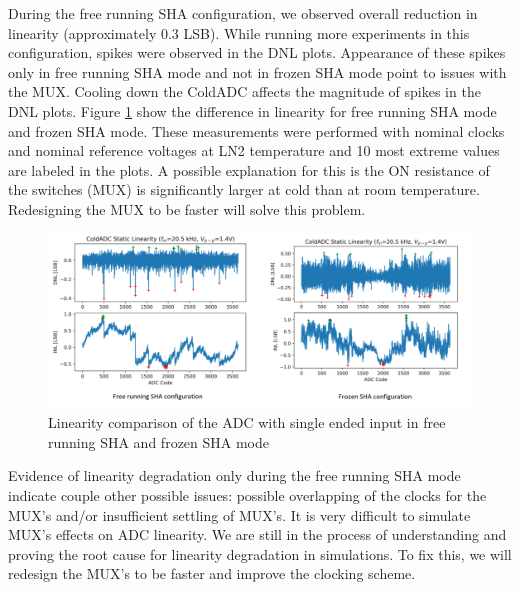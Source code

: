 During the free running SHA configuration, we observed overall reduction in linearity (approximately 0.3 LSB). While running more experiments in this configuration, spikes were observed in the DNL plots. Appearance of these spikes only in free running SHA mode and not in frozen SHA mode point to issues with the MUX. Cooling down the ColdADC affects the magnitude of spikes in the DNL plots. Figure \ref{fig:linearity_free_frozen} show the difference in linearity for free running SHA mode and frozen SHA mode. These measurements were performed with nominal clocks and nominal reference voltages at LN2 temperature and 10 most extreme values are labeled in the plots. A possible explanation for this is the ON resistance of the switches (MUX) is significantly larger at cold than at room temperature. Redesigning the MUX to be faster will solve this problem. 
\begin{figure}[h!]
\centering
  \includegraphics[width=1\linewidth]{figures/prakash_fig/linearity_free_frozen.png}
  \caption{Linearity comparison of the ADC with single ended input in free running SHA and frozen SHA mode}
  \label{fig:linearity_free_frozen}
\end{figure}

Evidence of linearity degradation only during the free running SHA mode indicate couple other possible issues: possible overlapping of the clocks for the MUX's and/or insufficient settling of MUX's. It is very difficult to simulate MUX's effects on ADC linearity. We are still in the process of understanding and proving the root cause for linearity degradation in simulations. To fix this, we will redesign the MUX's to be faster and improve the clocking scheme. 



